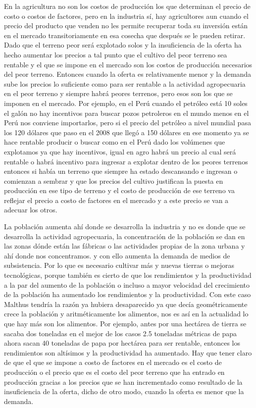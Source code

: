 \documentclass[
  a4paper,
]{article}
\begin{document}
En la agricultura no son los costos de producción los que determinan el
precio de costo o costos de factores, pero en la industria sí, hay
agricultores aun cuando el precio del producto que venden no les permite
recuperar toda su inversión están en el mercado transitoriamente en esa
cosecha que después se le pueden retirar. Dado que el terreno peor será
explotado solos y la insuficiencia de la oferta ha hecho aumentar los
precios a tal punto que el cultivo del peor terreno sea rentable y el
que se impone en el mercado son los costos de producción necesarios del
peor terreno. Entonces cuando la oferta es relativamente menor y la
demanda sube los precios lo suficiente como para ser rentable a la
actividad agropecuaria en el peor terreno y siempre habrá peores
terrenos, pero esos son los que se imponen en el mercado. Por ejemplo,
en el Perú cuando el petróleo está 10 soles el galón no hay incentivos
para buscar pozos petroleros en el mundo menos en el Perú nos conviene
importarlos, pero si el precio del petróleo a nivel mundial pasa los 120
dólares que paso en el 2008 que llegó a 150 dólares en ese momento ya se
hace rentable producir o buscar como en el Perú dado los volúmenes que
explotamos ya que hay incentivos, igual en agro habrá un precio al cual
será rentable o habrá incentivo para ingresar a explotar dentro de los
peores terrenos entonces si había un terreno que siempre ha estado
descansando e ingresan o comienzan a sembrar y que los precios del
cultivo justifican la puesta en producción en ese tipo de terreno y el
costo de producción de ese terreno va reflejar el precio a costo de
factores en el mercado y a este precio se van a adecuar los otros.

La población aumenta ahí donde se desarrolla la industria y no es donde
que se desarrolla la actividad agropecuaria, la concentración de la
población se dan en las zonas dónde están las fábricas o las actividades
propias de la zona urbana y ahí donde nos concentramos. y con ello
aumenta la demanda de medios de subsistencia. Por lo que es necesario
cultivar más y nuevas tierras o mejoras tecnológicas, porque también es
cierto de que los rendimientos y la productividad a la par del aumento
de la población o incluso a mayor velocidad del crecimiento de la
población ha aumentado los rendimientos y la productividad. Con este
caso Malthus tendría la razón ya hubiera desaparecido ya que decía
geométricamente crece la población y aritméticamente los alimentos, nos
es así en la actualidad lo que hay más son los alimentos. Por ejemplo,
antes por una hectárea de tierra se sacaba dos toneladas en el mejor de
los casos 2.5 toneladas métricas de papa ahora sacan 40 toneladas de
papa por hectárea para ser rentable, entonces los rendimientos son
altísimos y la productividad ha aumentado. Hay que tener claro de que el
que se impone a costo de factores en el mercado es el costo de
producción o el precio que es el costo del peor terreno que ha entrado
en producción gracias a los precios que se han incrementado como
resultado de la insuficiencia de la oferta, dicho de otro modo, cuando
la oferta es menor que la demanda.
\end{document}
